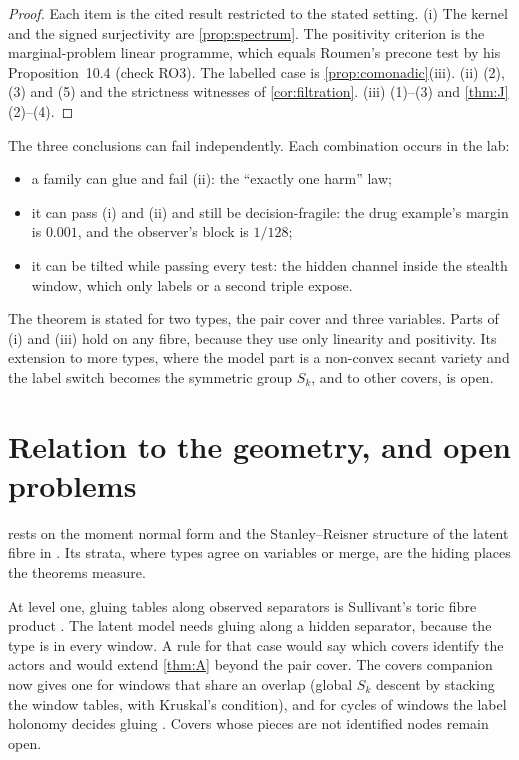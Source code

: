 \documentclass[11pt]{article}
\theoremstyle{definition}\newtheorem{definition}{Definition}\newtheorem{remark}{Remark}
\begin{document}
\begin{proof}
Each item is the cited result restricted to the stated setting. (i) The kernel and the signed surjectivity are \cref{prop:spectrum}. The
positivity criterion is the marginal-problem linear programme, which equals Roumen's precone test by his Proposition~10.4 (check RO3). The
labelled case is \cref{prop:comonadic}(iii). (ii) (2), (3) and (5) and the strictness witnesses of \cref{cor:filtration}.
(iii) (1)--(3) and \cref{thm:J}(2)--(4).
\end{proof}

The three conclusions can fail independently. Each combination occurs in the lab:
\begin{itemize}
\item a family can glue and fail (ii): the ``exactly one harm'' law;
\item it can pass (i) and (ii) and still be decision-fragile: the drug example's margin is $0.001$, and the observer's block is $1/128$;
\item it can be tilted while passing every test: the hidden channel inside the stealth window, which only labels or a second triple
  expose.
\end{itemize}
The theorem is stated for two types, the pair cover and three variables. Parts of (i) and (iii) hold on any fibre, because they use only
linearity and positivity. Its extension to more types, where the model part is a non-convex secant variety and the label switch becomes
the symmetric group $S_k$, and to other covers, is open.



\section{Relation to the geometry, and open problems}\label{sec:open}
 rests on the moment normal form and the Stanley--Reisner structure of the latent fibre in \cite{PG}. Its strata, where
types agree on variables or merge, are the hiding places the theorems measure.

At level one, gluing tables along observed separators is Sullivant's toric fibre product
\cite{Sullivant2007,EngstromKahleSullivant2014}. The latent model needs gluing along a hidden separator, because the type is in every
window. A rule for that case would say which covers identify the actors and would extend \cref{thm:A} beyond the pair cover. The covers
companion now gives one for windows that share an overlap (global $S_k$ descent by stacking the window tables, with Kruskal's condition), and
for cycles of windows the label holonomy decides gluing \cite[Theorems ``$S_k$ descent'' and ``label holonomy'']{CoversCompanion}. Covers whose
pieces are not identified nodes remain open.
\end{document}
